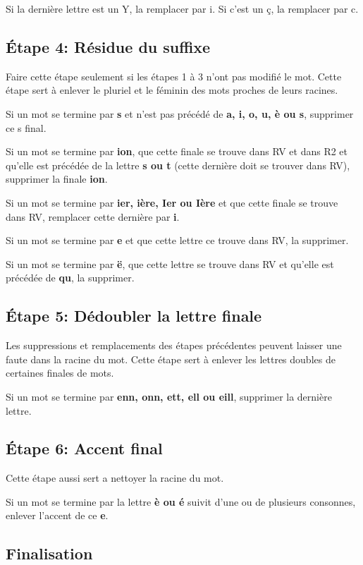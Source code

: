 Si la dernière lettre est un Y, la remplacer par i.
Si c'est un ç, la remplacer par c.

\subsection*{Étape 4: Résidue du suffixe}

Faire cette étape seulement si les étapes 1 à 3 n'ont pas modifié le mot.
Cette étape sert à enlever le pluriel et le féminin des mots proches de leurs racines.

Si un mot se termine par \textbf{s} et n'est pas précédé de \textbf{a, i, o, u, è ou s}, supprimer ce s final.

Si un mot se termine par \textbf{ion}, que cette finale se trouve dans RV et dans R2 et qu'elle est précédée de la lettre \textbf{s ou t} (cette dernière doit se trouver dans RV), supprimer la finale \textbf{ion}.

Si un mot se termine par \textbf{ier, ière, Ier ou Ière} et que cette finale se trouve dans RV, remplacer cette dernière par \textbf{i}.

Si un mot se termine par \textbf{e} et que cette lettre ce trouve dans RV, la supprimer.

Si un mot se termine par \textbf{ë}, que cette lettre se trouve dans RV et qu'elle est précédée de \textbf{qu}, la supprimer.

\subsection*{Étape 5: Dédoubler la lettre finale}

Les suppressions et remplacements des étapes précédentes peuvent laisser une faute dans la racine du mot.
Cette étape sert à enlever les lettres doubles de certaines finales de mots.

Si un mot se termine par \textbf{enn, onn, ett, ell ou eill}, supprimer la dernière lettre.

\subsection*{Étape 6: Accent final}

Cette étape aussi sert a nettoyer la racine du mot.

Si un mot se termine par la lettre \textbf{è ou é} suivit d'une ou de plusieurs consonnes, enlever l'accent de ce \textbf{e}.

\subsection*{Finalisation}

